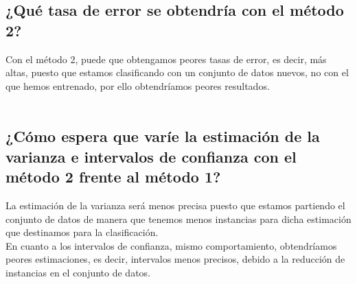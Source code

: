 \documentclass{article}
\begin{document}
\subsection{¿Qué tasa de error se obtendría con el método 2?}
Con el método 2, puede que obtengamos peores tasas de error, es decir, más altas, puesto que estamos clasificando con un conjunto de datos nuevos, no con el que hemos entrenado, por ello obtendríamos peores resultados.\\
\\
\subsection{¿Cómo espera que varíe la estimación de la varianza e intervalos de confianza con el método 2
frente al método 1?}
La estimación de la varianza será menos precisa puesto que estamos partiendo el conjunto de datos de manera que tenemos menos instancias para dicha estimación que destinamos para la clasificación.\\
En cuanto a los intervalos de confianza, mismo comportamiento, obtendríamos peores estimaciones, es decir, intervalos menos precisos, debido a la reducción de instancias en el conjunto de datos.
\end{document}
